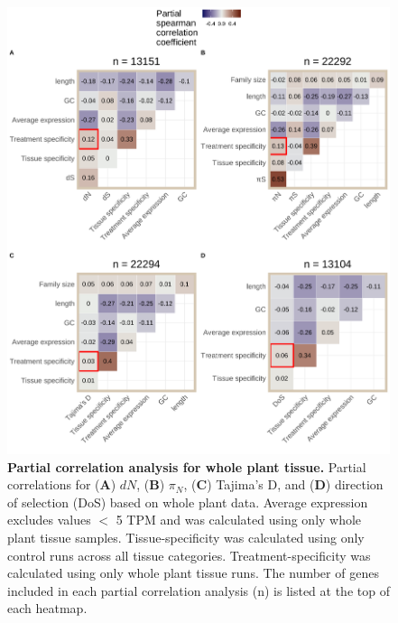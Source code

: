 \documentclass[12pt]{article}
\begin{document}
\begin{figure}[H]
\centering
\includegraphics[width = \linewidth]{figures/appendix_a/partialCorrelations_withTissueSpecificity_wholePlant_2023-02-20.pdf}
\caption{\textbf{Partial correlation analysis for whole plant tissue.} Partial correlations for (\textbf{A}) $dN$, (\textbf{B}) $\pi_N$, (\textbf{C}) Tajima's D, and (\textbf{D}) direction of selection (DoS) based on whole plant data. Average expression excludes values $<$ 5 TPM and was calculated using only whole plant tissue samples. Tissue-specificity was calculated using only control runs across all tissue categories. Treatment-specificity was calculated using only whole plant tissue runs. The number of genes included in each partial correlation analysis (n) is listed at the top of each heatmap.}%
\end{figure}

\newpage
\end{document}
